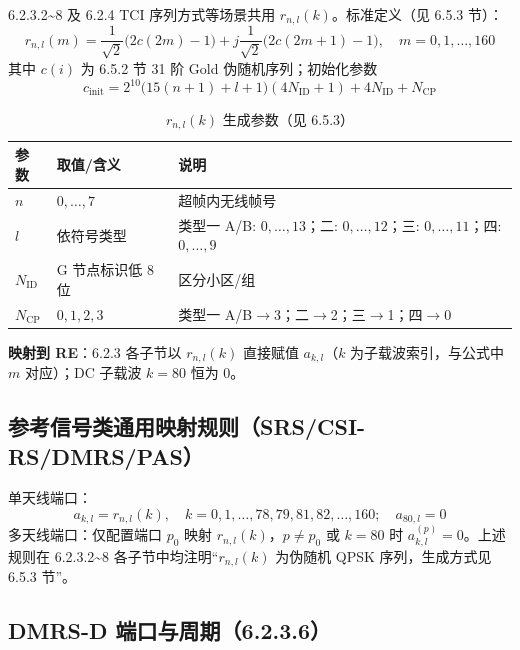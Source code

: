 \documentclass[11pt,a4paper]{ctexart}
\begin{document}
6.2.3.2\textasciitilde 8 及 6.2.4 TCI 序列方式等场景共用 $r_{n,l}(k)$。标准定义（见 6.5.3 节）：
\begin{equation}
r_{n,l}(m) = \frac{1}{\sqrt{2}}\bigl(2c(2m)-1\bigr) + j\frac{1}{\sqrt{2}}\bigl(2c(2m{+}1)-1\bigr), \quad m=0,1,\ldots,160
\end{equation}
其中 $c(i)$ 为 6.5.2 节 31 阶 Gold 伪随机序列；初始化参数
\begin{equation}
c_{\mathrm{init}} = 2^{10}\bigl(15(n{+}1)+l{+}1\bigr)(4N_{\mathrm{ID}}{+}1) + 4N_{\mathrm{ID}} + N_{\mathrm{CP}}
\end{equation}
\begin{table}[h]
\centering
\small
\caption{$r_{n,l}(k)$ 生成参数（见 6.5.3）}
\begin{tabular}{lll}
\toprule
\textbf{参数} & \textbf{取值/含义} & \textbf{说明} \\
\midrule
$n$ & $0,\ldots,7$ & 超帧内无线帧号 \\
$l$ & 依符号类型 & 类型一 A/B: $0,\ldots,13$；二: $0,\ldots,12$；三: $0,\ldots,11$；四: $0,\ldots,9$ \\
$N_{\mathrm{ID}}$ & G 节点标识低 8 位 & 区分小区/组 \\
$N_{\mathrm{CP}}$ & $0,1,2,3$ & 类型一 A/B$\rightarrow$3；二$\rightarrow$2；三$\rightarrow$1；四$\rightarrow$0 \\
\bottomrule
\end{tabular}
\end{table}

\textbf{映射到 RE}：6.2.3 各子节以 $r_{n,l}(k)$ 直接赋值 $a_{k,l}$（$k$ 为子载波索引，与公式中 $m$ 对应）；DC 子载波 $k{=}80$ 恒为 0。

\subsection{参考信号类通用映射规则（SRS/CSI-RS/DMRS/PAS）}

单天线端口：
\begin{equation}
a_{k,l} = r_{n,l}(k), \quad k=0,1,\ldots,78,79,81,82,\ldots,160;\quad a_{80,l}=0
\end{equation}
多天线端口：仅配置端口 $p_0$ 映射 $r_{n,l}(k)$，$p{\neq}p_0$ 或 $k{=}80$ 时 $a_{k,l}^{(p)}{=}0$。上述规则在 6.2.3.2\textasciitilde 8 各子节中均注明``$r_{n,l}(k)$ 为伪随机 QPSK 序列，生成方式见 6.5.3 节''。

\subsection{DMRS-D 端口与周期（6.2.3.6）}
\end{document}
